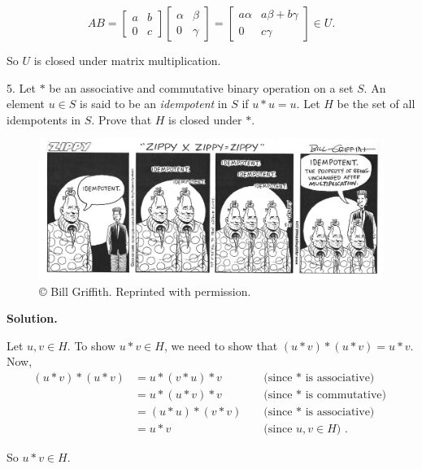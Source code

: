 \documentclass[10pt,]{book}
\theoremstyle{plain}
\theoremstyle{definition}
\theoremstyle{definition}
\theoremstyle{definition}
\theoremstyle{definition}
\numberwithin{equation}{section}
\newcommand{\amp}{ & }
\begin{document}
\begin{exerciselist}
\begin{enumerate}[label=(\alph*)]
\begin{equation*}

            AB=
            \begin{bmatrix}
            a \amp  b \\
            0 \amp  c
            \end{bmatrix} 
            \begin{bmatrix}
            \alpha \amp  \beta \\
            0 \amp  \gamma
            \end{bmatrix} 
            =
            \begin{bmatrix}
            a\alpha \amp  a\beta+b\gamma \\
            0 \amp  c\gamma
            \end{bmatrix} 
          \in U.
          
\end{equation*}

          So \(U\) is closed under matrix multiplication.
\end{enumerate}
\item[5.]\hypertarget{exercise-11}{}
        Let \(*\) be an associative and commutative binary operation on a set \(S\). An element \(u\in S\) is said to be an \emph{idempotent} in \(S\) if \(u*u=u\). Let \(H\) be the set of all idempotents in \(S\). Prove that \(H\) is closed under \(*\).
\leavevmode%
\begin{figure}
\centering
\includegraphics[width=1\linewidth]{zippy.png}
\caption{©  Bill Griffith. Reprinted with permission.\label{zip}}
\end{figure}
\par\smallskip
\par\smallskip
\noindent\textbf{Solution.}\hypertarget{solution-11}{}\quad

      Let \(u,v\in H\). To show \(u*v\in H\), we need to show that \((u*v)*(u*v)=u*v\). Now,
\begin{align*}
(u*v)*(u*v)\amp =u*(v*u)*v \amp \amp \text{ (since \(*\) is associative) }\\
\amp =u*(u*v)*v \amp \amp \text{ (since \(*\) is commutative) }\\
\amp =(u*u)*(v*v) \amp \amp \text{ (since \(*\) is associative) }\\
\amp =u*v \amp \amp \text{ (since \(u,v\in H\)) } .
\end{align*}

\par

      So \(u*v\in H\).
\end{exerciselist}
\end{document}
